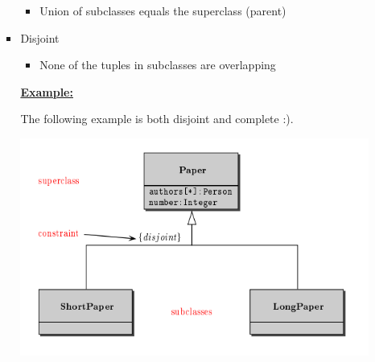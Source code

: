 \documentclass[12pt]{article}
\begin{document}
\begin{enumerate}[1.]
\begin{enumerate}[a)]
\begin{itemize}
            \begin{itemize}
                \item Union of subclasses equals the superclass (parent)
            \end{itemize}

            \item Disjoint
            \begin{itemize}
                \item None of the tuples in subclasses are overlapping
            \end{itemize}

            \bigskip

            \underline{\textbf{Example:}}

            \bigskip

            The following example is both disjoint and complete :).

            \begin{center}
            \includegraphics[width=\linewidth]{images/worksheet_15_solution_38.png}
            \end{center}
        \end{itemize}
    \end{enumerate}


\end{enumerate}
\end{document}
